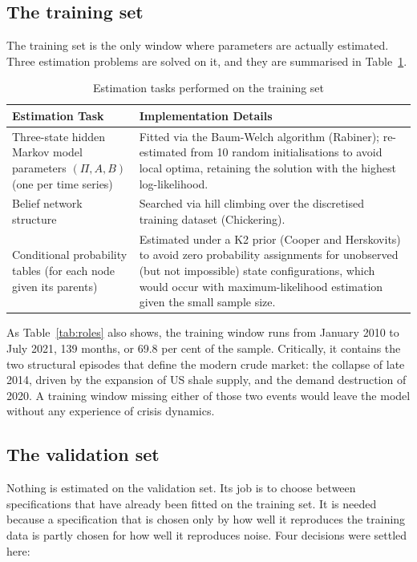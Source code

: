 \documentclass[11pt,a4paper]{article}
\begin{document}
\subsection{The training set}

The training set is the only window where parameters are actually estimated. Three estimation
problems are solved on it, and they are summarised in Table~\ref{tab:training_tasks}.

\begin{table}[H]
\centering
\caption{Estimation tasks performed on the training set}
\label{tab:training_tasks}
\renewcommand{\arraystretch}{1.3}
\begin{tabular}{@{}p{3.5cm}p{\dimexpr\textwidth-3.5cm-2\tabcolsep\relax}@{}}
\toprule
\textbf{Estimation Task} & \textbf{Implementation Details} \\
\midrule
Three-state hidden Markov model parameters $(\Pi, A, B)$ (one per time series) & Fitted via the Baum-Welch algorithm (Rabiner); re-estimated from 10 random initialisations to avoid local optima, retaining the solution with the highest log-likelihood. \\
\midrule
Belief network structure & Searched via hill climbing over the discretised training dataset (Chickering). \\
\midrule
Conditional probability tables (for each node given its parents) & Estimated under a K2 prior (Cooper and Herskovits) to avoid zero probability assignments for unobserved (but not impossible) state configurations, which would occur with maximum-likelihood estimation given the small sample size. \\
\bottomrule
\end{tabular}
\end{table}

As Table~\ref{tab:roles} also shows, the training window runs from January 2010 to July 2021,
139 months, or 69.8 per cent of the sample. Critically, it contains the two structural episodes
that define the modern crude market: the collapse of late 2014, driven by the expansion of US
shale supply, and the demand destruction of 2020. A training window missing either of those two
events would leave the model without any experience of crisis dynamics.

\subsection{The validation set}

Nothing is estimated on the validation set. Its job is to choose between specifications that have
already been fitted on the training set. It is needed because a specification that is chosen only
by how well it reproduces the training data is partly chosen for how well it reproduces noise.
Four decisions were settled here:
\end{document}
